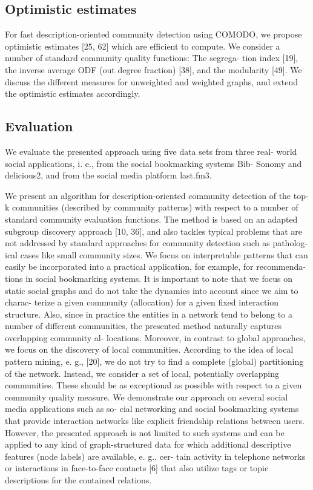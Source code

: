 \documentclass[a4paper]{article}
\begin{document}
\subsection{Optimistic estimates}
For fast description-oriented community detection using COMODO, we propose optimistic estimates [25, 62] which are efficient to compute. We consider a number of standard community quality functions: The segrega- tion index [19], the inverse average ODF (out degree fraction) [38], and the modularity [49]. We discuss the different measures for unweighted and weighted graphs, and extend the optimistic estimates accordingly.
\subsection{Evaluation}
We evaluate the presented approach using five data sets from three real- world social applications, i. e., from the social bookmarking systems Bib- Sonomy and delicious2, and from the social media platform last.fm3.

We present an algorithm for description-oriented community detection of the top-k communities (described by community patterns) with respect to a number of standard community evaluation functions. The method is based on an adapted subgroup discovery approach [10, 36], and also tackles typical problems that are not addressed by standard approaches for community detection such as patholog- ical cases like small community sizes. We focus on interpretable patterns that can easily be incorporated into a practical application, for example, for recommenda- tions in social bookmarking systems. It is important to note that we focus on static social graphs and do not take the dynamics into account since we aim to charac- terize a given community (allocation) for a given fixed interaction structure. Also, since in practice the entities in a network tend to belong to a number of different communities, the presented method naturally captures overlapping community al- locations. Moreover, in contrast to global approaches, we focus on the discovery of local communities. According to the idea of local pattern mining, e. g., [20], we do not try to find a complete (global) partitioning of the network. Instead, we consider a set of local, potentially overlapping communities. These should be as exceptional as possible with respect to a given community quality measure.
We demonstrate our approach on several social media applications such as so- cial networking and social bookmarking systems that provide interaction networks like explicit friendship relations between users. However, the presented approach is not limited to such systems and can be applied to any kind of graph-structured data for which additional descriptive features (node labels) are available, e. g., cer- tain activity in telephone networks or interactions in face-to-face contacts [6] that also utilize tags or topic descriptions for the contained relations.
\end{document}
